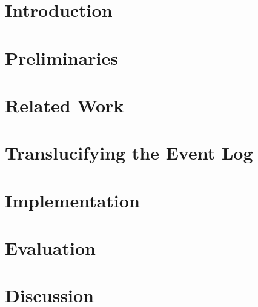 \documentclass[a4paper,11pt,twoside]{pads-thesis}
\begin{document}

\gTitlePage

% 

\tableofcontents

\cleardoublepage
\pagestyle{fancy}

\chapter{Introduction} \label{chap:intro}


\chapter{Preliminaries} \label{chap:prelim}


\chapter{Related Work} \label{chap:related_work}


\chapter{Translucifying the Event Log} \label{chap:method}


\chapter{Implementation} \label{chap:impl}


\chapter{Evaluation} \label{chap:eval}


\chapter{Discussion} \label{chap:discussion}

\end{document}
